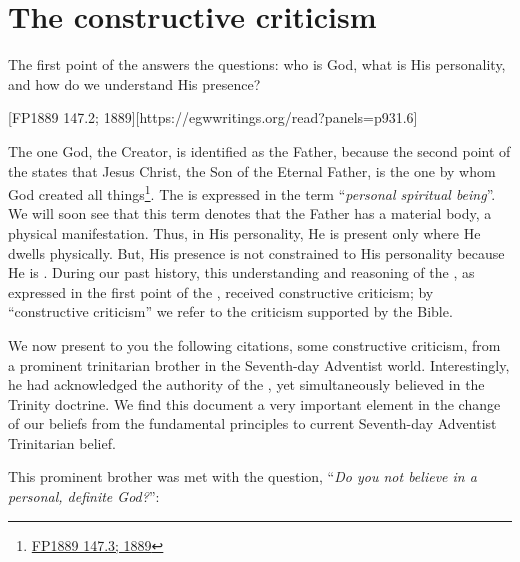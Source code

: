 \chapter{The constructive criticism}

The first point of the  answers the questions: who is God, what is His personality, and how do we understand His presence?

[FP1889 147.2; 1889][https://egwwritings.org/read?panels=p931.6]

The one God, the Creator, is identified as the Father, because the second point of the  states that Jesus Christ, the Son of the Eternal Father, is the one by whom God created all things\footnote{\href{https://egwwritings.org/?ref=en_FP1889.147.3&para=931.7}{FP1889 147.3; 1889}}. The  is expressed in the term “\textit{personal spiritual being}”. We will soon see that this term denotes that the Father has a material body, a physical manifestation. Thus, in His personality, He is present only where He dwells physically. But, His presence is not constrained to His personality because He is . During our past history, this understanding and reasoning of the , as expressed in the first point of the , received constructive criticism; by “constructive criticism” we refer to the criticism supported by the Bible. 

We now present to you the following citations, some constructive criticism, from a prominent trinitarian brother in the Seventh-day Adventist world. Interestingly, he had acknowledged the authority of the , yet simultaneously believed in the Trinity doctrine. We find this document a very important element in the change of our beliefs from the fundamental principles to current Seventh-day Adventist Trinitarian belief.

This prominent brother was met with the question, “\textit{Do you not believe in a personal, definite God?}”:


